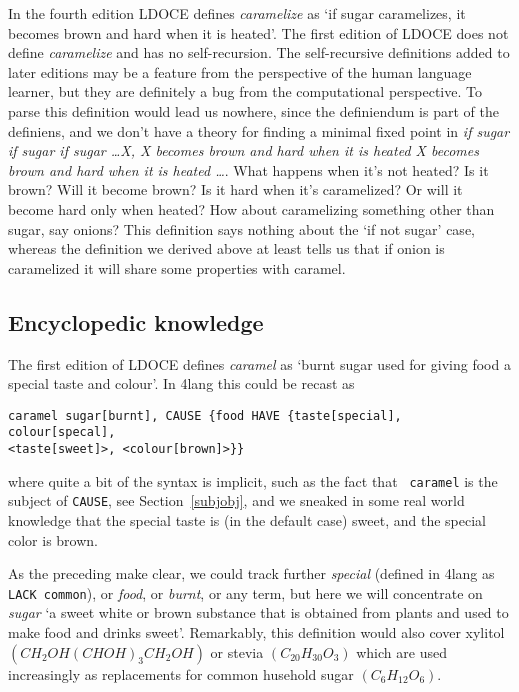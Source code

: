 \documentclass[11pt,bookmarks,bookmarksnumbered,naturalnames,plainpages=false,pdftex,colorlinks=true,urlcolor=blue,bookmarksdepth=subsection,plainpages=false]{paper}
\begin{document}
In the fourth edition \citep{Bullon:2003} LDOCE defines {\it caramelize} as
`if sugar caramelizes, it becomes brown and hard when it is heated'.  The
first edition of LDOCE \citep{Procter:1978} does not define {\it caramelize}
and has no self-recursion. The self-recursive definitions added to later
editions may be a feature from the perspective of the human language learner,
but they are definitely a bug from the computational perspective.  To parse this
definition would lead us nowhere, since the definiendum is part of the
definiens, and we don't have a theory for finding a minimal fixed point in
{\it if sugar if sugar if sugar \ldots X, X becomes brown and hard when it is
  heated X becomes brown and hard when it is heated \ldots}. What happens when
it's not heated? Is it brown? Will it become brown? Is it hard when it's
caramelized? Or will it become hard only when heated? How about caramelizing
something other than sugar, say onions? This definition says nothing about the
`if not sugar' case, whereas the definition we derived above at least tells us
that if onion is caramelized it will share some properties with caramel.

\subsection{Encyclopedic knowledge}

The first edition of LDOCE \citep{Procter:1978} defines {\it caramel} as
`burnt sugar used for giving food a special taste and colour'. In 4lang this
could be recast as 

\begin{verbatim}
caramel sugar[burnt], CAUSE {food HAVE {taste[special], colour[specal], 
<taste[sweet]>, <colour[brown]>}}
\end{verbatim}

\noindent
where quite a bit of the syntax is implicit, such as the fact that {\tt
  caramel} is the subject of {\tt CAUSE}, see Section~\ref{subjobj}, and we
sneaked in some real world knowledge that the special taste is (in the default
case) sweet, and the special color is brown.

As the preceding make clear, we could track further {\it special} (defined in
4lang as {\tt LACK common}), or {\it food}, or {\it burnt}, or any term, but
here we will concentrate on {\it sugar} `a sweet white or brown substance that
is obtained from plants and used to make food and drinks sweet'. Remarkably,
this definition would also cover xylitol $(CH_2OH(CHOH)_3CH_2OH)$ or stevia
$(C_{20}H_{30}O_3)$ which are used increasingly as replacements for common
husehold sugar $(C_6H_{12}O_6)$.
\end{document}
